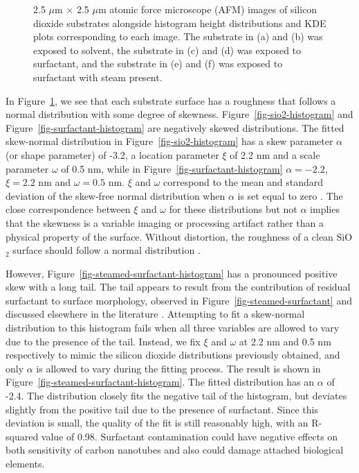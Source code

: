 \documentclass[
  a4paper,
]{scrbook}
\begin{document}
\begin{figure}
\begin{minipage}[t]{0.47\linewidth}
{{}

}

\subcaption{\label{fig-steamed-surfactant-histogram}}
\end{minipage}%

\caption{\label{fig-afm-substrate}2.5 \(\mu\)m \(\times\) 2.5 \(\mu\)m
atomic force microscope (AFM) images of silicon dioxide substrates
alongside histogram height distributions and KDE plots corresponding to
each image. The substrate in (a) and (b) was exposed to solvent, the
substrate in (c) and (d) was exposed to surfactant, and the substrate in
(e) and (f) was exposed to surfactant with steam present.}

\end{figure}

In Figure~\ref{fig-afm-substrate}, we see that each substrate surface
has a roughness that follows a normal distribution with some degree of
skewness. Figure~\ref{fig-sio2-histogram} and
Figure~\ref{fig-surfactant-histogram} are negatively skewed
distributions. The fitted skew-normal distribution in
Figure~\ref{fig-sio2-histogram} has a skew parameter \(\alpha\) (or
shape parameter) of -3.2, a location parameter \(\xi\) of 2.2 nm and a
scale parameter \(\omega\) of 0.5 nm, while in
Figure~\ref{fig-surfactant-histogram} \(\alpha = -2.2\), \(\xi = 2.2\)
nm and \(\omega = 0.5\) nm. \(\xi\) and \(\omega\) correspond to the
mean and standard deviation of the skew-free normal distribution when
\(\alpha\) is set equal to zero \autocite{Azzalini1999}. The close
correspondence between \(\xi\) and \(\omega\) for these distributions
but not \(\alpha\) implies that the skewness is a variable imaging or
processing artifact rather than a physical property of the surface.
Without distortion, the roughness of a clean SiO\(_2\) surface should
follow a normal distribution \autocite{Velicky2015}.

However, Figure~\ref{fig-steamed-surfactant-histogram} has a pronounced
positive skew with a long tail. The tail appears to result from the
contribution of residual surfactant to surface morphology, observed in
Figure~\ref{fig-steamed-surfactant} and discussed elsewhere in the
literature \autocite{Vobornik2023}. Attempting to fit a skew-normal
distribution to this histogram fails when all three variables are
allowed to vary due to the presence of the tail. Instead, we fix \(\xi\)
and \(\omega\) at 2.2 nm and 0.5 nm respectively to mimic the silicon
dioxide distributions previously obtained, and only \(\alpha\) is
allowed to vary during the fitting process. The result is shown in
Figure~\ref{fig-steamed-surfactant-histogram}. The fitted distribution
has an \(\alpha\) of -2.4. The distribution closely fits the negative
tail of the histogram, but deviates slightly from the positive tail due
to the presence of surfactant. Since this deviation is small, the
quality of the fit is still reasonably high, with an R-squared value of
0.98. Surfactant contamination could have negative effects on both
sensitivity of carbon nanotubes and also could damage attached
biological elements.
\end{document}
